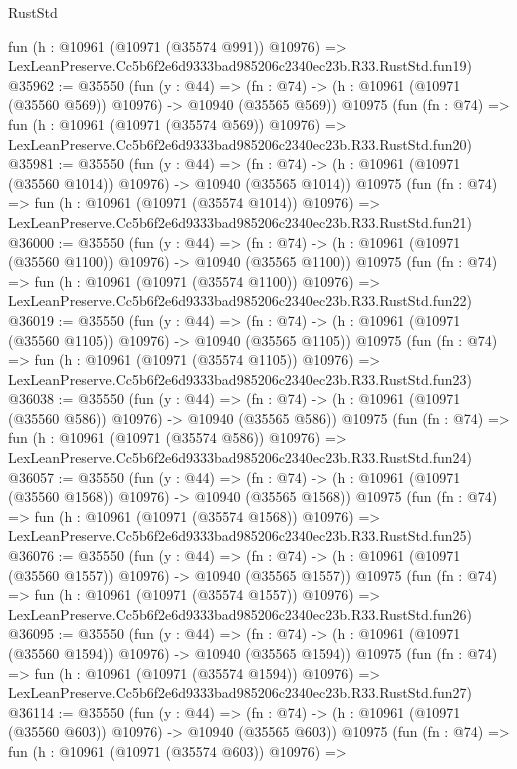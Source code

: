 \begin{lexlean}{RustStd}
\begin{coremodule}
    fun (h : @10961 (@10971 (@35574 @991)) @10976) =>
    LexLeanPreserve.Cc5b6f2e6d9333bad985206c2340ec23b.R33.RustStd.fun19)
@35962 := @35550
    (fun (y : @44) =>
    (fn : @74) -> (h : @10961 (@10971 (@35560 @569)) @10976) -> @10940 (@35565 @569))
    @10975
    (fun (fn : @74) =>
    fun (h : @10961 (@10971 (@35574 @569)) @10976) =>
    LexLeanPreserve.Cc5b6f2e6d9333bad985206c2340ec23b.R33.RustStd.fun20)
@35981 := @35550
    (fun (y : @44) =>
    (fn : @74) -> (h : @10961 (@10971 (@35560 @1014)) @10976) -> @10940 (@35565 @1014))
    @10975
    (fun (fn : @74) =>
    fun (h : @10961 (@10971 (@35574 @1014)) @10976) =>
    LexLeanPreserve.Cc5b6f2e6d9333bad985206c2340ec23b.R33.RustStd.fun21)
@36000 := @35550
    (fun (y : @44) =>
    (fn : @74) -> (h : @10961 (@10971 (@35560 @1100)) @10976) -> @10940 (@35565 @1100))
    @10975
    (fun (fn : @74) =>
    fun (h : @10961 (@10971 (@35574 @1100)) @10976) =>
    LexLeanPreserve.Cc5b6f2e6d9333bad985206c2340ec23b.R33.RustStd.fun22)
@36019 := @35550
    (fun (y : @44) =>
    (fn : @74) -> (h : @10961 (@10971 (@35560 @1105)) @10976) -> @10940 (@35565 @1105))
    @10975
    (fun (fn : @74) =>
    fun (h : @10961 (@10971 (@35574 @1105)) @10976) =>
    LexLeanPreserve.Cc5b6f2e6d9333bad985206c2340ec23b.R33.RustStd.fun23)
@36038 := @35550
    (fun (y : @44) =>
    (fn : @74) -> (h : @10961 (@10971 (@35560 @586)) @10976) -> @10940 (@35565 @586))
    @10975
    (fun (fn : @74) =>
    fun (h : @10961 (@10971 (@35574 @586)) @10976) =>
    LexLeanPreserve.Cc5b6f2e6d9333bad985206c2340ec23b.R33.RustStd.fun24)
@36057 := @35550
    (fun (y : @44) =>
    (fn : @74) -> (h : @10961 (@10971 (@35560 @1568)) @10976) -> @10940 (@35565 @1568))
    @10975
    (fun (fn : @74) =>
    fun (h : @10961 (@10971 (@35574 @1568)) @10976) =>
    LexLeanPreserve.Cc5b6f2e6d9333bad985206c2340ec23b.R33.RustStd.fun25)
@36076 := @35550
    (fun (y : @44) =>
    (fn : @74) -> (h : @10961 (@10971 (@35560 @1557)) @10976) -> @10940 (@35565 @1557))
    @10975
    (fun (fn : @74) =>
    fun (h : @10961 (@10971 (@35574 @1557)) @10976) =>
    LexLeanPreserve.Cc5b6f2e6d9333bad985206c2340ec23b.R33.RustStd.fun26)
@36095 := @35550
    (fun (y : @44) =>
    (fn : @74) -> (h : @10961 (@10971 (@35560 @1594)) @10976) -> @10940 (@35565 @1594))
    @10975
    (fun (fn : @74) =>
    fun (h : @10961 (@10971 (@35574 @1594)) @10976) =>
    LexLeanPreserve.Cc5b6f2e6d9333bad985206c2340ec23b.R33.RustStd.fun27)
@36114 := @35550
    (fun (y : @44) =>
    (fn : @74) -> (h : @10961 (@10971 (@35560 @603)) @10976) -> @10940 (@35565 @603))
    @10975
    (fun (fn : @74) =>
    fun (h : @10961 (@10971 (@35574 @603)) @10976) =>

\end{coremodule}
\end{lexlean}

